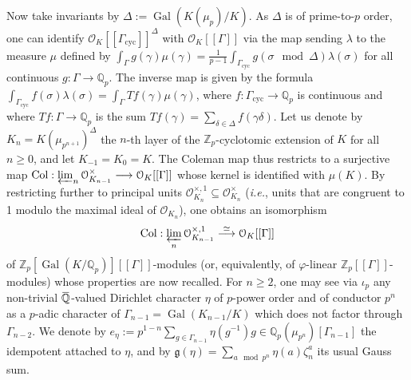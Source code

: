 \documentclass[12pt]{amsart}
\newcommand\bQ{\mathbb{Q}}
\newcommand\Zp{{\mathbb{Z}_p}}
\newcommand\Qp{{\mathbb{Q}_p}}
\newcommand\cO{\mathcal{O}}
\newcommand\g{\mathfrak{g}}
\newcommand{\ob}[1]{\mkern 1.5mu\overline{\mkern-1.5mu#1\mkern-1.5mu}\mkern 1.5mu}
\DeclareMathOperator{\Gal}{Gal}
\DeclareMathOperator{\cyc}{cyc}
\DeclareMathOperator{\Coleman}{Col}
\theoremstyle{defstyle}
\theoremstyle{thmstyle}
\begin{document}
Now take invariants by $\Delta:=\Gal(K(\mu_p)/K)$. As $\Delta$ is of prime-to-$p$ order, one can identify $\cO_K[[\Gamma_{\cyc}]]^{\Delta}$ with $\cO_K[[\Gamma]]$ via the map sending $\lambda$ to the measure $\mu$ defined by $\int_{\Gamma}g(\gamma)\mu(\gamma)= \frac{1}{p-1}\int_{\Gamma_{\cyc}}g(\sigma \!\!\!\mod \Delta)\lambda(\sigma)$ for all continuous $g:\Gamma \longrightarrow \Qp$. The inverse map is given by the formula $\int_{\Gamma_{\cyc}} f(\sigma)\lambda(\sigma)=\int_{\Gamma} Tf(\gamma)\mu(\gamma)$, where $f:\Gamma_{\cyc} \longrightarrow \Qp$ is continuous and where $Tf: \Gamma \longrightarrow \Qp$ is the sum $Tf(\gamma)=\sum_{\delta\in\Delta} f(\gamma\delta)$. 
Let us denote by $K_n=K(\mu_{p^{n+1}})^\Delta$ the $n$-th layer of the $\Zp$-cyclotomic extension of $K$ for all $n\geq 0$, and let $K_{-1}=K_0=K$. The Coleman map thus restricts to a surjective map $\Coleman : \varprojlim_n \cO_{K_{n-1}}^\times \longrightarrow \cO_K[[\Gamma]]$ whose kernel is identified with $\mu(K)$. By restricting further to principal units $\cO^{\times,1}_{K_n}\subseteq \cO_{K_{n}}^\times$ (\textit{i.e.}, units that are congruent to 1 modulo the maximal ideal of $\cO_{K_{n}}$), one obtains an isomorphism 
\begin{equation}\label{eq:coleman_map}
\Coleman : \varprojlim_n \cO^{\times,1}_{K_{n-1}} \overset{\simeq}{\longrightarrow} \cO_K[[\Gamma]]
\end{equation}
of $\Zp[\Gal(K/\Qp)][[\Gamma]]$-modules (or, equivalently, of $\varphi$-linear $\Zp[[\Gamma]]$-modules) whose properties are now recalled. For $n\geq2$, one may see via $\iota_p$ any non-trivial $\ob{\bQ}$-valued Dirichlet character $\eta$ of $p$-power order and of conductor $p^n$ as a $p$-adic character of $\Gamma_{n-1}=\Gal(K_{n-1}/K)$ which does not factor through $\Gamma_{n-2}$. We denote by $e_\eta:= p^{1-n}\sum_{g\in \Gamma_{n-1}} \eta(g^{-1})g \in \Qp(\mu_{p^{n}})[\Gamma_{n-1}]$ the idempotent attached to $\eta$, and by $\g(\eta)=\sum_{a \mod p^n} \eta(a) \zeta_n^a $ its usual Gauss sum. 
\end{document}
